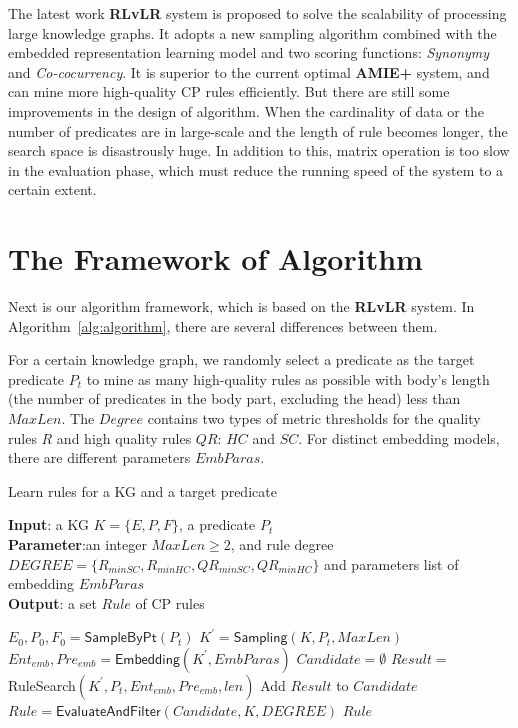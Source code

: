 \documentclass{article}
\begin{document}
	The latest work {\bf RLvLR} system \cite{Omran:RLvLR} is proposed to solve the scalability of  processing large knowledge graphs. It adopts a new sampling algorithm combined with the embedded representation learning model and two scoring functions: {\em Synonymy} and {\em Co-cocurrency}. 
	It is superior to the current optimal {\bf AMIE+} system, and can mine more high-quality CP rules efficiently. 
	But there are still some improvements in the design of algorithm. When the cardinality of data or the number of predicates are in large-scale and the length of rule becomes longer, the search space is disastrously huge. In addition to this, matrix operation is too slow in the evaluation phase, which must reduce the running speed of the system to a certain extent.
	
	
	\section{The Framework of Algorithm}
	Next is our algorithm framework, which is based on the {\bf RLvLR} system. In Algorithm~\ref{alg:algorithm}, there are several differences between them.
	
	For a certain knowledge graph, we randomly select a predicate as the target predicate $P_t$ to mine as many high-quality rules as possible with body's length (the number of predicates in the body part, excluding the head) less than $MaxLen$. The $Degree$ contains two types of metric thresholds for the quality rules $R$ and high quality rules $QR$: $HC$ and $SC$. For distinct embedding models, there are different parameters $EmbParas$. 
	\begin{algorithm}[tb]
		\caption{Learn rules for a KG and a target predicate}
		\label{alg:algorithm}
		\textbf{Input}: a KG $K=\{E, P, F\}$, a predicate $P_t$\\
		\textbf{Parameter}:an integer $MaxLen \geq 2$, and rule degree \\
		$DEGREE = \{ R_{minSC}, R_{minHC}, QR_{minSC}, QR_{minHC}\} $ 
		and parameters list of embedding $EmbParas$\\
		\textbf{Output}: a set $Rule$ of CP rules
		\begin{algorithmic}[1] %
			\STATE $E_0, P_0, F_0 = \textsf{SampleByPt}(P_t)$
			\STATE $K^{'} = \textsf{Sampling}(K, P_t, MaxLen)$
			\STATE $Ent_{emb}, Pre_{emb} =\textsf{Embedding} (K^{'}, EmbParas)$
			\STATE $Candidate = \emptyset$	
			\STATE $Result=$\textsf{RuleSearch}$(K^{'}, P_t, Ent_{emb}, Pre_{emb},len)$
			\STATE Add $Result$ to $Candidate$
			\ENDFOR
		\STATE $Rule=\textsf{EvaluateAndFilter}(Candidate,K,DEGREE)$
		\RETURN $Rule$
		\end{algorithmic}
	\end{algorithm}
\end{document}
